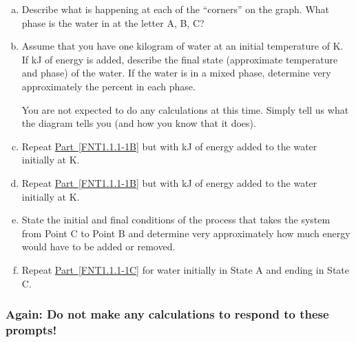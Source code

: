 \begin{enumerate}[(a)]
	\item Describe what is happening at each of the ``corners'' on the graph. What phase is the water in at the letter A, B, C?
	\label{FNT1.1.1-1A}
	
	\item Assume that you have one kilogram of water at an initial temperature of \unit[200]{K}. If \unit[795]{kJ} of energy is added, describe the final state (approximate temperature and phase) of the water. If the water is in a mixed phase, determine very approximately the percent in each phase.
	
		You are not expected to do any calculations at this time. Simply tell us what the diagram tells you (and how you know that it does).
	\label{FNT1.1.1-1B}
	
	\item Repeat \hyperref[FNT1.1.1-1B]{Part~\ref*{FNT1.1.1-1B}} but with \unit[146]{kJ} of energy added to the water initially at \unit[200]{K}.
	
	\item Repeat \hyperref[FNT1.1.1-1B]{Part~\ref*{FNT1.1.1-1B}} but with \unit[1650]{kJ} of energy added to the water initially at \unit[200]{K}.
	
	\item State the initial and final conditions of the process that takes the system from Point C to Point B and determine very approximately how much energy would have to be added or removed.
	\label{FNT1.1.1-1C}
	
	\item Repeat \hyperref[FNT1.1.1-1C]{Part~\ref*{FNT1.1.1-1C}} for water initially in State A and ending in State C.
	\label{FNT1.1.1-1D}
	
\end{enumerate}

\subsubsection*{Again: Do not make any calculations to respond to these prompts!}